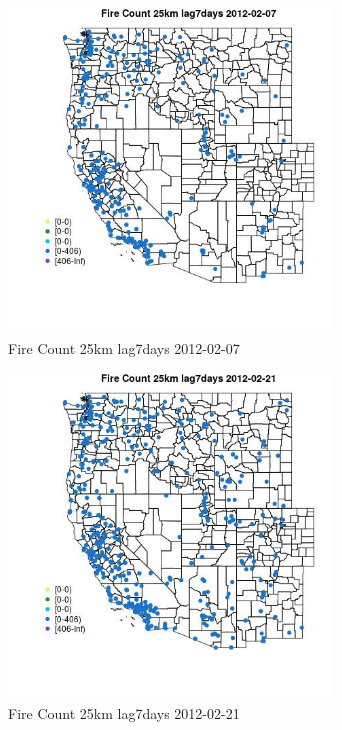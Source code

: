 \begin{figure} 
\centering  
\includegraphics[width=0.77\textwidth]{Code_Outputs/Report_ML_input_PM25_Step4_part_f_de_duplicated_aveswNAs_MapObsFire_Count_25km_lag7days2012-02-07.jpg} 
\caption{\label{fig:Report_ML_input_PM25_Step4_part_f_de_duplicated_aveswNAsMapObsFire_Count_25km_lag7days2012-02-07}Fire Count 25km lag7days 2012-02-07} 
\end{figure} 
 

\begin{figure} 
\centering  
\includegraphics[width=0.77\textwidth]{Code_Outputs/Report_ML_input_PM25_Step4_part_f_de_duplicated_aveswNAs_MapObsFire_Count_25km_lag7days2012-02-21.jpg} 
\caption{\label{fig:Report_ML_input_PM25_Step4_part_f_de_duplicated_aveswNAsMapObsFire_Count_25km_lag7days2012-02-21}Fire Count 25km lag7days 2012-02-21} 
\end{figure} 
 

